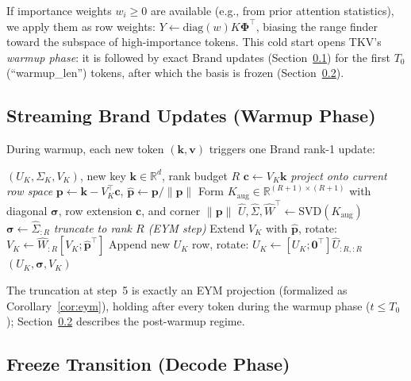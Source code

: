 \documentclass{article}
\newcommand{\R}{\mathbb{R}}
\let\PhiSymbol\Phi
\renewcommand{\Phi}{\boldsymbol{\PhiSymbol}}
\begin{document}
If importance weights $w_i \geq 0$ are available (e.g., from prior attention
statistics), we apply them as row weights: $Y \leftarrow \mathrm{diag}(w)K\Phi^\top$,
biasing the range finder toward the subspace of high-importance tokens.
This cold start opens TKV's \emph{warmup phase}: it is followed by exact
Brand updates (Section~\ref{sec:brand}) for the first $T_0$ (``warmup\_len'')
tokens, after which the basis is frozen (Section~\ref{sec:freeze}).

\subsection{Streaming Brand Updates (Warmup Phase)}
\label{sec:brand}

During warmup, each new token $(\mathbf{k}, \mathbf{v})$ triggers one Brand
rank-1 update:

\begin{algorithm}[H]
\caption{Brand Rank-1 Update (per token)}
\begin{algorithmic}[1]
\Require $(U_K, \Sigma_K, V_K)$, new key $\mathbf{k} \in \R^d$, rank budget $R$
\State $\mathbf{c} \leftarrow V_K \mathbf{k}$  \hfill \textit{project onto current row space}
\State $\mathbf{p} \leftarrow \mathbf{k} - V_K^\top \mathbf{c}$,
       $\hat{\mathbf{p}} \leftarrow \mathbf{p}/\|\mathbf{p}\|$
\State Form $K_{\mathrm{aug}} \in \R^{(R+1)\times(R+1)}$ with diagonal $\boldsymbol{\sigma}$, row extension $\mathbf{c}$, and corner $\|\mathbf{p}\|$
\State $\hat{U}, \hat{\Sigma}, \hat{W}^\top \leftarrow \mathrm{SVD}(K_{\mathrm{aug}})$
\State $\boldsymbol{\sigma} \leftarrow \hat{\Sigma}_{:R}$  \hfill \textit{truncate to rank $R$ (EYM step)}
\State Extend $V_K$ with $\hat{\mathbf{p}}$, rotate: $V_K \leftarrow \hat{W}_{:R} [V_K; \hat{\mathbf{p}}^\top]$
\State Append new $U_K$ row, rotate: $U_K \leftarrow [U_K; \mathbf{0}^\top] \hat{U}_{:R,:R}$
\State \Return $(U_K, \boldsymbol{\sigma}, V_K)$
\end{algorithmic}
\end{algorithm}

The truncation at step~5 is exactly an EYM projection (formalized as
Corollary~\ref{cor:eym}), holding after every token during the warmup phase
($t \leq T_0$); Section~\ref{sec:freeze} describes the post-warmup regime.

\subsection{Freeze Transition (Decode Phase)}
\label{sec:freeze}
\end{document}
